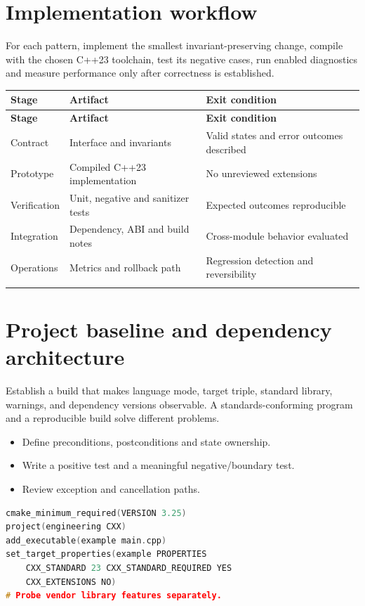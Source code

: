 \documentclass[11pt]{article}
\begin{document}
\docfront
\section{Implementation workflow}
For each pattern, implement the smallest invariant-preserving change, compile with the chosen C++23 toolchain, test its negative cases, run enabled diagnostics and measure performance only after correctness is established.

\small
\begin{longtable}{@{}p{.18\linewidth}p{.40\linewidth}p{.34\linewidth}@{}}
\toprule
\textbf{Stage} & \textbf{Artifact} & \textbf{Exit condition}\\
\midrule
\endfirsthead
\toprule
\textbf{Stage} & \textbf{Artifact} & \textbf{Exit condition}\\
\midrule
\endhead
Contract & Interface and invariants & Valid states and error outcomes described\\
\addlinespace[2pt]
Prototype & Compiled C++23 implementation & No unreviewed extensions\\
\addlinespace[2pt]
Verification & Unit, negative and sanitizer tests & Expected outcomes reproducible\\
\addlinespace[2pt]
Integration & Dependency, ABI and build notes & Cross-module behavior evaluated\\
\addlinespace[2pt]
Operations & Metrics and rollback path & Regression detection and reversibility\\
\addlinespace[2pt]
\bottomrule
\end{longtable}
\normalsize
\section{Project baseline and dependency architecture}
Establish a build that makes language mode, target triple, standard library, warnings, and dependency versions observable. A standards-conforming program and a reproducible build solve different problems.

\begin{itemize}[leftmargin=*,itemsep=1pt,topsep=3pt]
\item Define preconditions, postconditions and state ownership.
\item Write a positive test and a meaningful negative/boundary test.
\item Review exception and cancellation paths.
\end{itemize}
\begin{lstlisting}[language=C++]
cmake_minimum_required(VERSION 3.25)
project(engineering CXX)
add_executable(example main.cpp)
set_target_properties(example PROPERTIES
    CXX_STANDARD 23 CXX_STANDARD_REQUIRED YES
    CXX_EXTENSIONS NO)
# Probe vendor library features separately.
\end{lstlisting}
\end{document}
